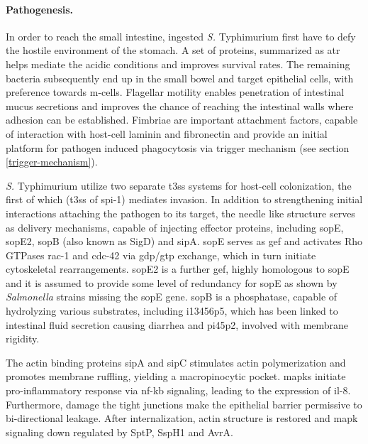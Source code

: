 \paragraph{Pathogenesis.}
In order to reach the small intestine, ingested \textit{S.} Typhimurium first have to defy the hostile environment of the stomach. A set of proteins, summarized as \gls{atr} helps mediate the acidic conditions and improves survival rates. The remaining bacteria subsequently end up in the small bowel and target epithelial cells, with preference towards \gls{m-cells}. Flagellar motility enables penetration of intestinal mucus secretions and improves the chance of reaching the intestinal walls where adhesion can be established. Fimbriae are important attachment factors, capable of interaction with host-cell laminin and fibronectin and provide an initial platform for pathogen induced phagocytosis via trigger mechanism (see section \ref{trigger-mechanism}). 

\textit{S.} Typhimurium utilize two separate \gls{t3ss} systems for host-cell colonization, the first of which (\gls{t3ss} of \acrshort{spi}-1) mediates invasion. In addition to strengthening initial interactions attaching the pathogen to its target, the needle like structure serves as delivery mechanisms, capable of injecting effector proteins, including \acrshort{sop}E, \acrshort{sop}E2, \acrshort{sop}B (also known as SigD) and \gls{sip}A. \Acrshort{sop}E serves as \gls{gef} and activates Rho GTPases \gls{rac-1} and \gls{cdc-42} via \acrshort{gdp}/\acrshort{gtp} exchange, which in turn initiate cytoskeletal rearrangements. \Acrshort{sop}E2 is a further \gls{gef}, highly homologous to \acrshort{sop}E and it is assumed to provide some level of redundancy for \acrshort{sop}E as shown by \textit{Salmonella} strains missing the \acrshort{sop}E gene. \Acrshort{sop}B is a phosphatase, capable of hydrolyzing various substrates, including \gls{i13456p5}, which has been linked to intestinal fluid secretion causing diarrhea and \gls{pi45p2}, involved with membrane rigidity. 

The actin binding proteins \gls{sip}A and \gls{sip}C stimulates actin polymerization and promotes membrane ruffling, yielding a macropinocytic pocket. \Glspl{mapk} initiate pro-inflammatory response via \gls{nf-kb} signaling, leading to the expression of \gls{il-8}. Furthermore, damage the tight junctions make the epithelial barrier permissive to bi-directional leakage. After internalization, actin structure is restored and \gls{mapk} signaling down regulated by SptP, SspH1 and AvrA.

